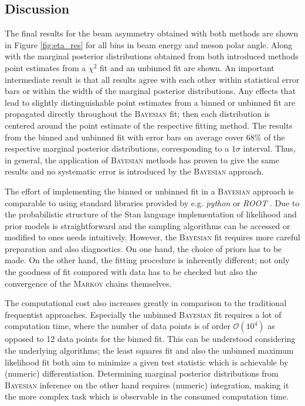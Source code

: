 \subsection{Discussion}
\label{sec:sigma_eta}
The final results for the beam asymmetry obtained with both methods are shown in Figure \ref{fig:eta_res} for all bins in beam energy and meson polar angle. Along with the marginal posterior distributions obtained from both introduced methods point estimates from a $\chi^2$ fit and an unbinned fit \cite{farahphd} are shown. An important intermediate result is that all results agree with each other within statistical error bars or within the width of the marginal posterior distributions. Any effects that lead to slightly distinguishable point estimates from a binned or unbinned fit are propagated directly throughout the \textsc{Bayesian} fit; then each distribution is centered around the point estimate of the respective fitting method. The results from the binned and unbinned fit with error bars on average cover $68\%$ of the respective marginal posterior distributions, corresponding to a $1\sigma$ interval. Thus, in general, the application of \textsc{Bayesian} methods has proven to give the same results and no systematic error is introduced by the \textsc{Bayesian} approach. 

The effort of implementing the binned or unbinned fit in a \textsc{Bayesian} approach is comparable to using standard libraries provided by e.g. \emph{python} \cite{python} or \emph{ROOT} \cite{root}. Due to the probabilistic structure of the Stan language \cite{stan} implementation of likelihood and prior models is straightforward and the sampling algorithms can be accessed or modified to ones needs intuitively. However, the \textsc{Bayesian} fit requires more careful preparation and also diagnostics. On one hand, the choice of priors has to be made. On the other hand, the fitting procedure is inherently different; not only the goodness of fit compared with data has to be checked but also the convergence of the \textsc{Markov} chains themselves. 

The computational cost also increases greatly in comparison to the traditional frequentist approaches. Especially the unbinned \textsc{Bayesian} fit requires a lot of computation time,  where the number of data points is of order $\mathcal{O}(10^4)$ as opposed to 12 data points for the binned fit. This can be understood considering the underlying algorithms; the least squares fit and also the unbinned maximum likelihood fit both aim to minimize a given test statistic which is achievable by (numeric) differentiation. Determining marginal posterior distributions from \textsc{Bayesian} inference on the other hand requires (numeric) integration, making it the more complex task which is observable in the consumed computation time. 

